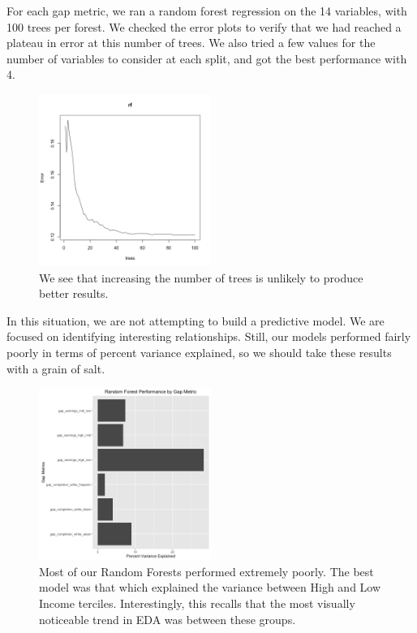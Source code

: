 \documentclass{article}
\begin{document}
For each gap metric, we ran a random forest regression on the 14 variables, with 100 trees per forest. We checked the error plots to verify that we had reached a plateau in error at this number of trees. We also tried a few values for the number of variables to consider at each split, and got the best performance with 4.

\begin{figure}[H]
\centering
\includegraphics[width=0.5\textwidth]{../images/rf_treesgap_completion_white_black.png}
\caption{\label{fig: WBRFerror} We see that increasing the number of trees is unlikely to produce better results.}
\end{figure}

In this situation, we are not attempting to build a predictive model. We are focused on identifying interesting relationships. Still, our models performed fairly poorly in terms of percent variance explained, so we should take these results with a grain of salt.

\begin{figure}[H]
\centering
\includegraphics[width=0.5\textwidth]{../images/rf_performance.png}
\caption{\label{fig: RFPerforomance} Most of our Random Forests performed extremely poorly. The best model was that which explained the variance between High and Low Income terciles. Interestingly, this recalls that the most visually noticeable trend in EDA was between these groups.}
\end{figure}
\end{document}
